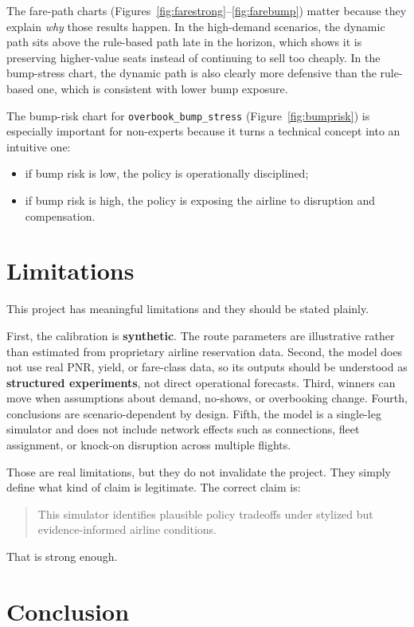 \documentclass[11pt,a4paper]{article}
\begin{document}
The fare-path charts (Figures~\ref{fig:farestrong}--\ref{fig:farebump}) matter because they explain \emph{why} those results happen. In the high-demand scenarios, the dynamic path sits above the rule-based path late in the horizon, which shows it is preserving higher-value seats instead of continuing to sell too cheaply. In the bump-stress chart, the dynamic path is also clearly more defensive than the rule-based one, which is consistent with lower bump exposure.

The bump-risk chart for \texttt{overbook\_bump\_stress} (Figure~\ref{fig:bumprisk}) is especially important for non-experts because it turns a technical concept into an intuitive one:
\begin{itemize}
  \item if bump risk is low, the policy is operationally disciplined;
  \item if bump risk is high, the policy is exposing the airline to disruption and compensation.
\end{itemize}

\section{Limitations}

This project has meaningful limitations and they should be stated plainly.

First, the calibration is \textbf{synthetic}. The route parameters are illustrative rather than estimated from proprietary airline reservation data. Second, the model does not use real PNR, yield, or fare-class data, so its outputs should be understood as \textbf{structured experiments}, not direct operational forecasts. Third, winners can move when assumptions about demand, no-shows, or overbooking change. Fourth, conclusions are scenario-dependent by design. Fifth, the model is a single-leg simulator and does not include network effects such as connections, fleet assignment, or knock-on disruption across multiple flights.

Those are real limitations, but they do not invalidate the project. They simply define what kind of claim is legitimate. The correct claim is:
\begin{quote}
This simulator identifies plausible policy tradeoffs under stylized but evidence-informed airline conditions.
\end{quote}
That is strong enough.

\section{Conclusion}
\end{document}
